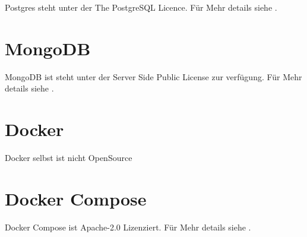 
Postgres steht unter der The PostgreSQL Licence.
Für Mehr details siehe .


\section{MongoDB}

MongoDB ist steht unter der Server Side Public License zur verfügung.
Für Mehr details siehe .

\section{Docker}

Docker selbst ist nicht OpenSource

\section{Docker Compose}

Docker Compose ist Apache-2.0 Lizenziert.
Für Mehr details siehe .

